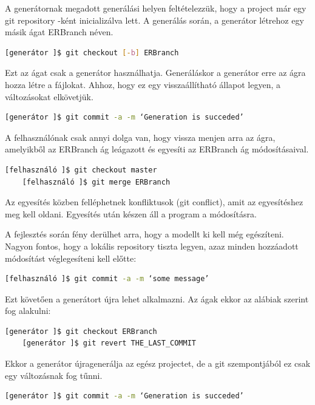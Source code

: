 \documentclass[a4paper,12pt,oneside]{report}
\begin{document}
\begin{justify}
	A generátornak megadott generálási helyen feltételezzük, hogy a project már egy git repository -ként inicializálva lett. A generálás során, a generátor létrehoz egy másik ágat ERBranch néven. 

	\begin{lstlisting}[language=bash]
	[generátor ]$ git checkout [-b] ERBranch 
	\end{lstlisting}

	Ezt az ágat csak a generátor használhatja. Generáláskor a generátor erre az ágra hozza létre a fájlokat. Ahhoz, hogy ez egy visszaállítható állapot legyen, a változásokat elkövetjük. 

	\begin{lstlisting}[language=bash]
	[generátor ]$ git commit -a -m ‘Generation is succeded’
	\end{lstlisting}

	A felhasználónak csak annyi dolga van, hogy vissza menjen arra az ágra, amelyikből az ERBranch ág leágazott és egyesíti az ERBranch ág módosításaival.

	\begin{lstlisting}[language=bash]
	[felhasználó ]$ git checkout master
	[felhasználó ]$ git merge ERBranch
	\end{lstlisting}

	Az egyesítés közben felléphetnek konfliktusok (git conflict), amit az egyesítéshez meg kell oldani. Egyesítés után készen áll a program a módosításra.

	A fejlesztés során fény derülhet arra, hogy a modellt ki kell még egészíteni. Nagyon fontos, hogy a lokális repository tiszta legyen, azaz minden hozzáadott módosítást véglegesíteni kell előtte:

	\begin{lstlisting}[language=bash]
	[felhasználó ]$ git commit -a -m ‘some message’
	\end{lstlisting}

	Ezt követően a generátort újra lehet alkalmazni. Az ágak ekkor az alábiak szerint fog alakulni: 

	\begin{lstlisting}[language=bash]
	[generátor ]$ git checkout ERBranch
	[generátor ]$ git revert THE_LAST_COMMIT
	\end{lstlisting}

	Ekkor a generátor újragenerálja az egész projectet, de a git szempontjából ez csak egy változásnak fog tűnni. 

	\begin{lstlisting}[language=bash]
	[generátor ]$ git commit -a -m ‘Generation is succeded’
	\end{lstlisting}


\end{justify}
\end{document}
